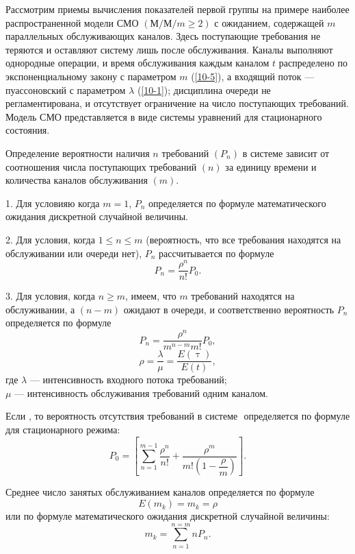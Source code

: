 Рассмотрим приемы вычисления показателей первой группы на примере наиболее распространенной модели СМО $(М/М/m \geq 2)$ с ожиданием, содержащей $m$ параллельных обслуживающих каналов. Здесь поступающие требования не теряются и оставляют систему лишь после обслуживания. Каналы выполняют однородные операции, и время обслуживания каждым каналом $t$ распределено по экспоненциальному закону с параметром $m$ (\ref{10-5}), а входящий поток — пуассоновский с параметром $\lambda$ (\ref{10-1}); дисциплина очереди не регламентирована, и отсутствует ограничение на число поступающих требований. Модель СМО представляется в виде системы уравнений для стационарного состояния.

Определение вероятности наличия $n$ требований $(P_n)$ в системе зависит от соотношения числа поступающих требований $(n)$  за единицу времени  и количества каналов обслуживания $(m)$.

1. Для условияю когда $ m =1 $, $P_n  $ определяется по формуле математического ожидания дискретной случайной величины.

2. Для условия, когда $ 1\leq n \leq m $ (вероятность, что все требования находятся на обслуживании или очереди нет), $ P_n $ рассчитывается по формуле
\begin{equation}\label{10-8}
P_n = \dfrac{\rho^n}{n!}P_0.
\end{equation}

3. Для условия, когда $n \geq m  $, имеем, что $  m$ требований находятся на обслуживании, а $  (n - m )$ ожидают в очереди, и соответственно вероятность $  P_n$ определяется по формуле
\begin{equation}\label{10-9}
P_n = \dfrac{\rho^n}{m^{n-m}m!}P_0,
\end{equation}
\begin{equation}\label{10-10}
\rho = \dfrac{\lambda}{\mu} = \dfrac{E(\uptau)}{E(t)},
\end{equation}
где $ \lambda $ --- интенсивность входного потока требований;\\
$ \mu $ --- интенсивность обслуживания требований одним каналом.

Если $  $, то вероятность отсутствия требований в системе $  $ определяется по формуле для стационарного режима:
\begin{equation}\label{10-11}
P_0 = \left[\sum\limits_{n=1}^{m-1}\dfrac{\rho^n}{n!} + \dfrac{\rho^m}{m!\left(1-\dfrac{\rho}{m}\right)}\right].
\end{equation}

Среднее число занятых обслуживанием каналов определяется по формуле
\begin{equation}\label{10-12}
E(m_k) = m_k = \rho
\end{equation}
или по формуле математического ожидания дискретной случайной величины:
\begin{equation}\label{10-13}
m_k = \sum\limits_{n=1}^{n=m} nP_n.
\end{equation}

